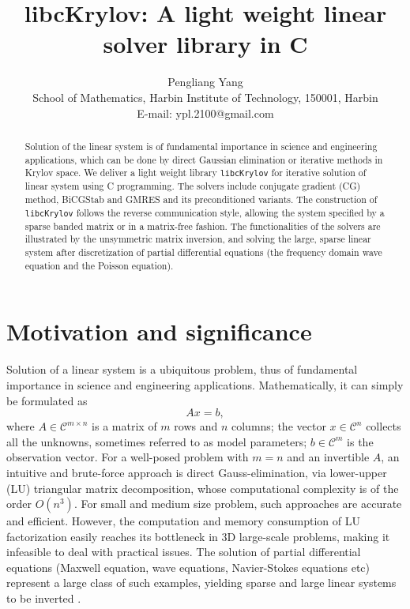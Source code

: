 \documentclass[10pt]{article}
\title{libcKrylov: A light weight linear solver library in C}
\author{Pengliang Yang\\
School of Mathematics, Harbin Institute of Technology, 150001, Harbin\\
E-mail: ypl.2100@gmail.com}
\begin{document}
\maketitle

\begin{abstract}

  Solution of the linear system is of fundamental importance in science and engineering applications, which can be done by direct Gaussian elimination  or iterative methods in Krylov space. We deliver a light weight library  \verb|libcKrylov| for iterative solution of linear system using C programming. The solvers include conjugate gradient (CG) method, BiCGStab and GMRES and its preconditioned variants. The construction of \verb|libcKrylov| follows the reverse communication style, allowing the system specified by a sparse banded matrix  or in a matrix-free fashion. The functionalities of the solvers are illustrated by the unsymmetric matrix inversion, and solving the large, sparse linear system after discretization of partial differential equations (the frequency domain wave equation and the Poisson equation). 

\end{abstract}



\section{Motivation and significance}

Solution of a linear system is a ubiquitous problem, thus of fundamental importance in science and engineering applications. Mathematically, it can simply be formulated as
\begin{equation}\label{eq:axb}
Ax = b,
\end{equation}
where $A \in \mathcal{C}^{m\times n}$ is a matrix of $m$ rows and $n$ columns; the vector $x\in \mathcal{C}^n$ collects all the unknowns, sometimes referred to as model parameters; $b\in \mathcal{C}^m$ is the observation vector. For a well-posed problem with $m=n$ and an invertible $A$, an intuitive and brute-force approach is direct Gauss-elimination, via lower-upper (LU) triangular matrix decomposition, whose computational complexity is of the order $O(n^3)$.  For small and medium size problem, such approaches are accurate and efficient. However, the computation and memory consumption of LU factorization easily reaches its bottleneck in 3D large-scale problems, making it infeasible to deal with practical issues. The solution of partial differential equations (Maxwell equation, wave equations, Navier-Stokes equations etc) represent a large class of such examples, yielding sparse and large linear systems to be inverted \citep{Saad_2003_IMS}.
\end{document}
